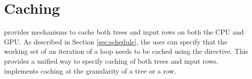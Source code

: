 
\section{Caching}
\label{sec:caching}


\Treebeard{} provides mechanisms to cache both trees and input rows 
on both the CPU and GPU. As described in Section \ref{sec:schedule}, 
the user can specify that the working set of an iteration of a loop
needs to be cached using the  directive. This 
provides a unified way to specify caching of both trees and input rows.
\Treebeard{} implements caching at the granularity of a tree or a row.

